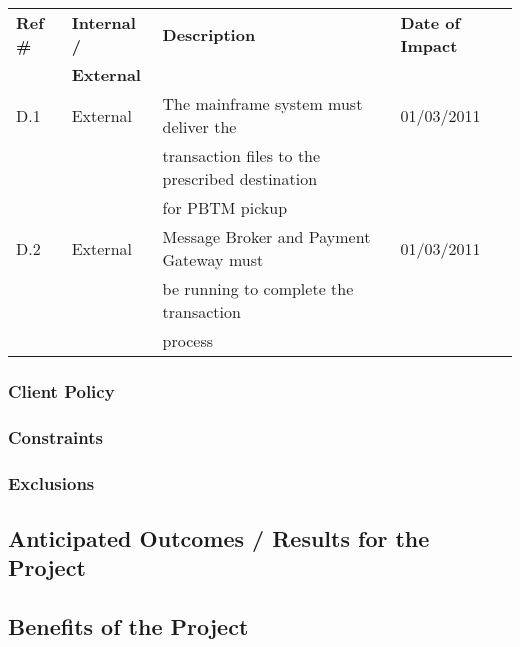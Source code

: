 \begin{tabular}{|l|l|l|l|}
\hline
{\bf Ref \#} & {\bf Internal / } & {\bf Description} & {\bf Date of Impact} \\ & {\bf External} & & \\
\hline
D.1 & External & The mainframe system must deliver the \ & 01/03/2011 \\ & & transaction files to the prescribed destination &  \\ & & for PBTM pickup  & \\
\hline
D.2 & External & Message Broker and Payment Gateway must  \ & 01/03/2011 \\ & & be running to complete the transaction  &  \\ & & process & \\
\hline
\end{tabular}

\newpage
\subsubsection{Client Policy}


\subsubsection{Constraints}


\subsubsection{Exclusions}


\newpage
\subsection{Anticipated Outcomes / Results for the Project}


\subsection{Benefits of the Project}
